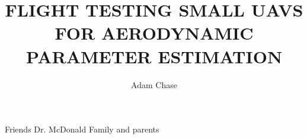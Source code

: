 \documentclass[12pt]{ucthesis}
\title{FLIGHT TESTING SMALL UAVS FOR AERODYNAMIC PARAMETER ESTIMATION}
\author{Adam Chase}
\begin{document}
\maketitle

\begin{frontmatter}
	
	\copyrightpage
	\committeemembershippage

\begin{abstract}


\end{abstract}

\begin{acknowledgements}
Friends
Dr. McDonald
Family and parents
\end{acknowledgements}


\tableofcontents


\listoftables

\listoffigures

\end{frontmatter}

\pagestyle{plain}


\renewcommand{\baselinestretch}{1.66}











%



\clearpage
\begin{appendices}


%
%


%

\end{appendices}


\clearpage



\end{document}
